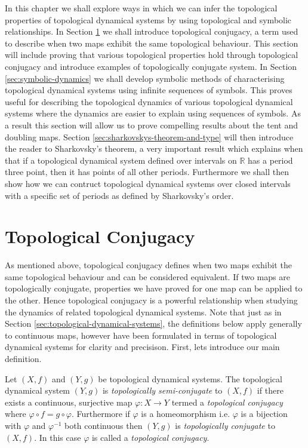 In this chapter we shall explore ways in which we can infer the topological properties of topological dynamical systems by using topological and symbolic relationships. In Section \ref{sec:topological-conjugacy} we shall introduce topological conjugacy, a term used to describe when two maps exhibit the same topological behaviour. This section will include proving that various topological properties hold through topological conjugacy and introduce examples of topologically conjugate system. In Section \ref{sec:symbolic-dynamics} we shall develop symbolic methods of characterising topological dynamical systems using infinite sequences of symbols. This proves useful for describing the topological dynamics of various topological dynamical systems where the dynamics are easier to explain using sequences of symbols. As a result this section will allow us to prove compelling results about the tent and doubling maps. Section \ref{sec:sharkovskys-theorem-and-type} will then introduce the reader to Sharkovsky's theorem, a very important result which explains when that if a topological dynamical system  defined over intervals on $\mathbb{R}$ has a period three point, then it has points of all other periods. Furthermore we shall then show how we can contruct topological dynamical systems over closed intervals with a specific set of periods as defined by Sharkovsky's order.

\section{Topological Conjugacy} \label{sec:topological-conjugacy}
As mentioned above, topological conjugacy defines when two maps exhibit the same topological behaviour and can be considered equivalent. If two maps are topologically conjugate, properties we have proved for one map can be applied to the other. Hence topological conjugacy is a powerful relationship when studying the dynamics of related topological dynamical systems. Note that just as in Section \ref{sec:topological-dynamical-systems}, the definitions below apply generally to continuous maps, however have been formulated in terms of topological dynamical systems for clarity and precisison. First, lets introduce our main definition.

\begin{defn} \label{defn:topological-conjugacy}
    Let $(X, f)$ and $(Y, g)$ be topological dynamical systems. The topological dynamical system $(Y, g)$ is \emph{topologically semi-conjugate} to $(X, f)$ if there exists a continuous, surjective map $\varphi: X \to Y$ termed a \emph{topological conjugacy} where $\varphi \circ f = g \circ \varphi$. Furthermore if $\varphi$ is a homeomorphism i.e. $\varphi$ is a bijection with $\varphi$ and $\varphi^{-1}$ both continuous then $(Y, g)$ is \emph{topologically conjugate} to $(X, f)$. In this case $\varphi$ is called a \emph{topological conjugacy}.
\end{defn}

